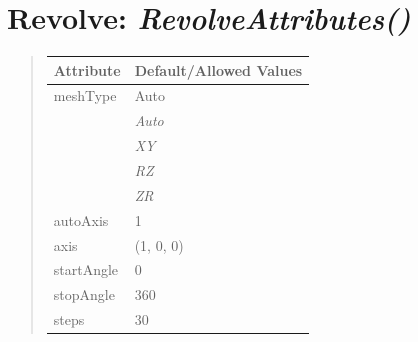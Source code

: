 \documentclass[letterpaper,10pt,english]{sphinxmanual}
\begin{document}
\section{\textbf{Revolve}: \emph{RevolveAttributes()}}
\label{attributes:revolve-revolveattributes}
\begin{DUlineblock}{0em}
\item[] 
\end{DUlineblock}
\begin{quote}

\begin{tabulary}{\linewidth}{|L|L|}
\hline

\textbf{Attribute}
 & 
\textbf{Default/Allowed Values}
\\
\hline
meshType
 & 
Auto
\\
\hline & 
\emph{Auto}
\\
\hline & 
\emph{XY}
\\
\hline & 
\emph{RZ}
\\
\hline & 
\emph{ZR}
\\
\hline
autoAxis
 & 
1
\\
\hline
axis
 & 
(1, 0, 0)
\\
\hline
startAngle
 & 
0
\\
\hline
stopAngle
 & 
360
\\
\hline
steps
 & 
30
\\
\hline\end{tabulary}

\end{quote}

\begin{DUlineblock}{0em}
\item[] 
\end{DUlineblock}

\begin{DUlineblock}{0em}
\item[] 
\end{DUlineblock}
\end{document}
